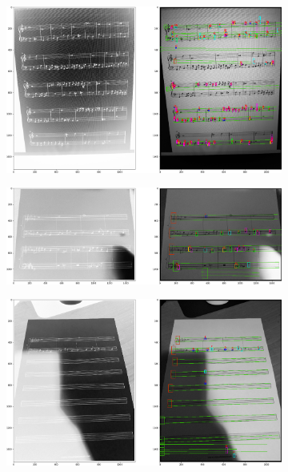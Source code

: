 \documentclass[12pt]{article}
\begin{document}
\begin{enumerate}
\begin{figure}
				\begin{subfigure}[b]{0.48\linewidth}
					\includegraphics[width=\linewidth]{Hard/Zdj33.png}
				\end{subfigure}
				\begin{subfigure}[b]{0.48\linewidth}
					\includegraphics[width=\linewidth]{Hard/Zdj34.png}
				\end{subfigure}
				\begin{subfigure}[b]{0.48\linewidth}
					\includegraphics[width=\linewidth]{Hard/Zdj35.png}
				\end{subfigure}

\end{figure}
\end{enumerate}
\end{document}
